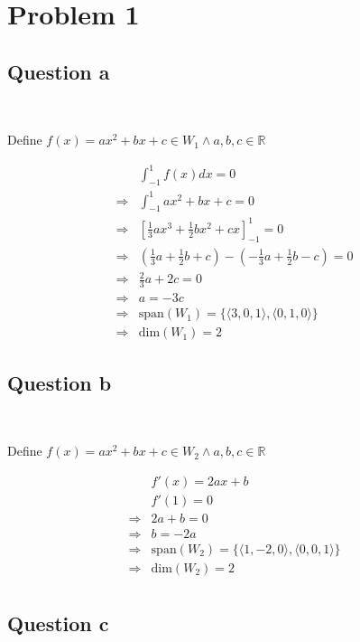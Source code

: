 \documentclass{article}
\def\R{\mathbb{R}}
\begin{document}
\section{Problem 1}

\subsection{Question a}

~

Define $f(x)=ax^2+bx+c \in W_1\land a,b,c\in \R$

\begin{equation}
\tag{1.1}
\begin{split}
&\int_{-1}^{1}f(x)dx=0\\
\Rightarrow &\int_{-1}^{1}ax^2+bx+c=0\\
\Rightarrow &\left[\frac{1}{3}ax^3+\frac{1}{2}bx^2+cx\right]_{-1}^{1}=0\\
\Rightarrow &(\frac{1}{3}a+\frac{1}{2}b+c)-(-\frac{1}{3}a+\frac{1}{2}b-c)=0\\
\Rightarrow &\frac{2}{3}a+2c=0\\
\Rightarrow &a=-3c\\
\Rightarrow &\text{span}(W_1)=\{\langle 3,0,1\rangle,\langle0,1,0\rangle\}\\
\Rightarrow &\text{dim}(W_1)=2
\end{split}
\end{equation}

\subsection{Question b}

~

Define $f(x)=ax^2+bx+c \in W_2\land a,b,c\in \R$

\begin{equation}
\tag{1.2}
\begin{split}
&f'(x)=2ax+b\\
&f'(1)=0\\
\Rightarrow &2a+b=0\\
\Rightarrow &b=-2a\\
\Rightarrow &\text{span}(W_2)=\{\langle1,-2,0\rangle,\langle0,0,1\rangle\}\\
\Rightarrow &\text{dim}(W_2)=2\\
\end{split}
\end{equation}

\subsection{Question c}
\end{document}
